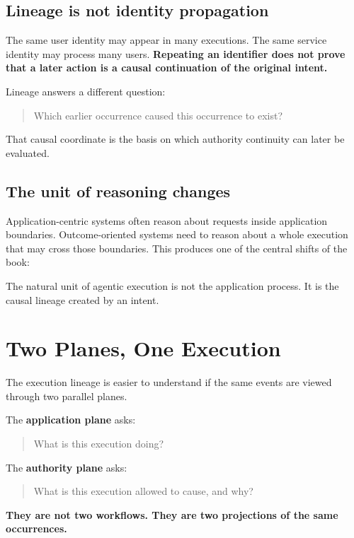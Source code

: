 \documentclass[10pt,oneside,openany]{book}
\newcommand{\term}[1]{\textbf{#1}}
\newcommand{\keyidea}[1]{%
  \vspace{3pt}
  \noindent\fbox{\begin{minipage}{0.94\linewidth}\small\raggedright\textbf{Key idea.} #1\end{minipage}}
  \vspace{3pt}
}
\renewcommand{\keyidea}[1]{\begin{keyideabox}#1\end{keyideabox}}
\begin{document}
\section{Lineage is not identity propagation}
The same user identity may appear in many executions. The same service identity may process many users. \textbf{Repeating an identifier does not prove that a later action is a causal continuation of the original intent.}

Lineage answers a different question:

\begin{quote}
Which earlier occurrence caused this occurrence to exist?
\end{quote}

That causal coordinate is the basis on which authority continuity can later be evaluated.

\section{The unit of reasoning changes}
Application-centric systems often reason about requests inside application boundaries. Outcome-oriented systems need to reason about a whole execution that may cross those boundaries. This produces one of the central shifts of the book:

\keyidea{The natural unit of agentic execution is not the application process. It is the causal lineage created by an intent.}

\chapter{Two Planes, One Execution}

The execution lineage is easier to understand if the same events are viewed through two parallel planes.

The \term{application plane} asks:

\begin{quote}
What is this execution doing?
\end{quote}

The \term{authority plane} asks:

\begin{quote}
What is this execution allowed to cause, and why?
\end{quote}

\textbf{They are not two workflows. They are two projections of the same occurrences.}
\end{document}
